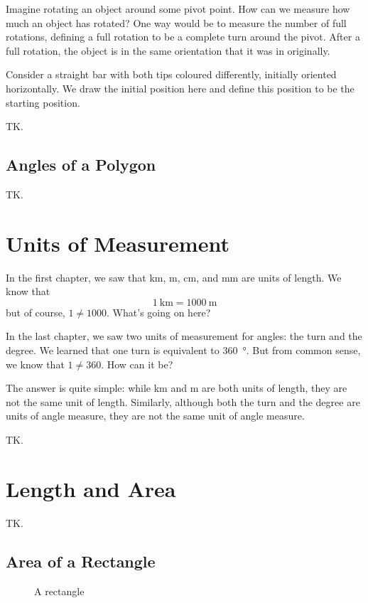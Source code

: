 \documentclass[a4paper,10pt]{report}
\begin{document}
Imagine rotating an object around some pivot point. How can we measure how much
an object has rotated? One way would be to measure the number of full rotations,
defining a full rotation to be a complete turn around the pivot. After a full
rotation, the object is in the same orientation that it was in originally.

Consider a straight bar with both tips coloured differently, initially oriented
horizontally. We draw the initial position here and define this position to be
the starting position.

TK.

\section{Angles of a Polygon}

TK.

\chapter{Units of Measurement}

In the first chapter, we saw that \si{\kilo\metre}, \si{\metre},
\si{\centi\metre}, and \si{\milli\metre} are units of length. We know that \[
  \SI{1}{\kilo\metre} = \SI{1000}{\metre}
\] but of course, \(1\ne1000\). What's going on here?

In the last chapter, we saw two units of measurement for angles: the turn and
the degree. We learned that one turn is equivalent to \SI{360}{\degree}. But
from common sense, we know that \(1 \ne 360\). How can it be?

The answer is quite simple: while \si{\kilo\metre} and \si{\metre} are both
units of length, they are not the same unit of length. Similarly, although both
the turn and the degree are units of angle measure, they are not the same unit
of angle measure.

TK.

\chapter{Length and Area}

TK.

\section{Area of a Rectangle}

\begin{figure}

  \caption{A rectangle}
  \label{ar:rectangle}
\end{figure}
\end{document}
